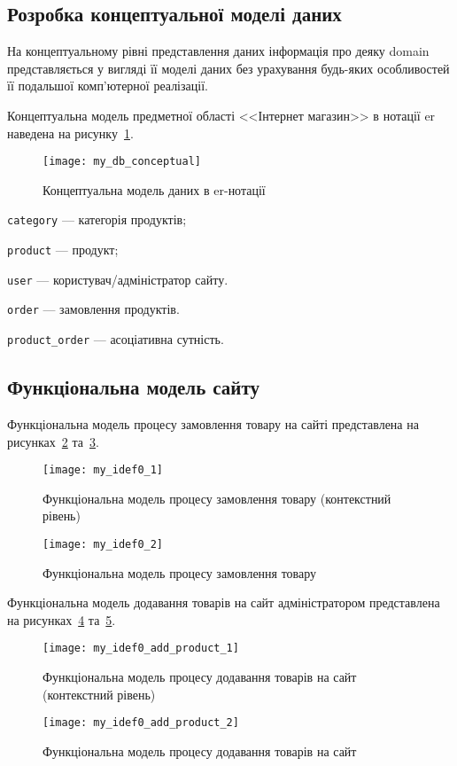 \subsection{Розробка концептуальної моделі даних}
На концептуальному рівні представлення даних інформація про деяку \acrshort{domain} представляється у вигляді її моделі даних без урахування будь-яких особливостей її подальшої комп'ютерної реалізації.

Концептуальна модель предметної області <<Інтернет магазин>> в нотації \acrshort{er} наведена на рисунку~\ref{fig:my_db_conceptual}.

\begin{figure}[H]
    \centering
    \texttt{[image: my\_db\_conceptual]}
    \caption{Концептуальна модель даних в \acrshort{er}-нотації}
    \label{fig:my_db_conceptual}
\end{figure}
\begin{description}
    \item[де] \texttt{category} --- категорія продуктів;
    \item \texttt{product} --- продукт;
    \item \texttt{user} --- користувач/адміністратор сайту.
    \item \texttt{order} --- замовлення продуктів.
    \item \texttt{product\_order} --- асоціативна сутність.
\end{description}

\subsection{Функціональна модель сайту}
Функціональна модель процесу замовлення товару на сайті представлена на рисунках~\ref{fig:my_idef0_1} та~\ref{fig:my_idef0_2}.
\begin{figure}[H]
    \centering
    \texttt{[image: my\_idef0\_1]}
    \caption{Функціональна модель процесу замовлення товару (контекстний рівень)}
    \label{fig:my_idef0_1}
\end{figure}
\begin{figure}[H]
    \centering 
    \texttt{[image: my\_idef0\_2]}
    \caption{Функціональна модель процесу замовлення товару}
    \label{fig:my_idef0_2}
\end{figure}

Функціональна модель додавання товарів на сайт адміністратором представлена на рисунках~\ref{fig:my_idef0_add_product_1} та~\ref{fig:my_idef0_add_product_2}.
\begin{figure}[H]
    \centering
    \texttt{[image: my\_idef0\_add\_product\_1]}
    \caption{Функціональна модель процесу додавання товарів на сайт (контекстний рівень)}
    \label{fig:my_idef0_add_product_1}
\end{figure}
\begin{figure}[H]
    \centering 
    \texttt{[image: my\_idef0\_add\_product\_2]}
    \caption{Функціональна модель процесу додавання товарів на сайт}
    \label{fig:my_idef0_add_product_2}
\end{figure}

